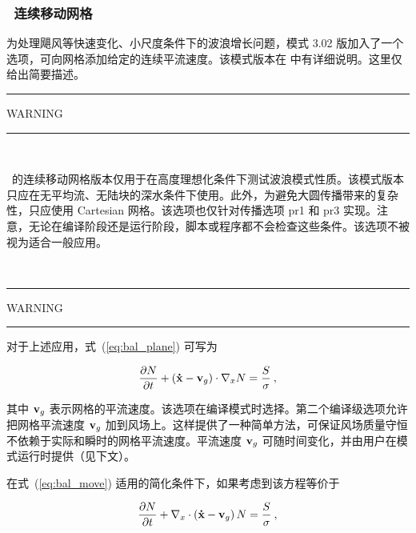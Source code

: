 \vsssub
\subsubsection{~连续移动网格} \label{sub:num_move}



为处理飓风等快速变化、小尺度条件下的波浪增长问题，模式 3.02 版加入了一个选项，可向网格添加给定的连续平流速度。该模式版本在 \cite{tol:OMOD05b} 中有详细说明。这里仅给出简要描述。



\begin{center}
\rule[1mm]{55mm}{1.0mm} WARNING \rule[1mm]{55mm}{1.0mm} \\
 \vspace{\baselineskip}
\parbox{120mm}{\ws\ 的连续移动网格版本仅用于在高度理想化条件下测试波浪模式性质。该模式版本只应在无平均流、无陆块的深水条件下使用。此外，为避免大圆传播带来的复杂性，只应使用 Cartesian 网格。该选项也仅针对传播选项 {\F pr1} 和 {\F pr3} 实现。注意，无论在编译阶段还是运行阶段，脚本或程序都不会检查这些条件。该选项不被视为适合一般应用。} \\
\vspace{\baselineskip}
\rule[1mm]{55mm}{1.0mm} WARNING \rule[1mm]{55mm}{1.0mm}
\end{center}

\noindent
对于上述应用，式~(\ref{eq:bal_plane}) 可写为

\begin{equation}
\frac{\partial N}{\partial t} + 
\left ( {\bf\dot{x}}-{\bf{v}}_g \right ) \cdot \nabla_x N  = 
\frac{S}{\sigma} \: , \label{eq:bal_move}
\end{equation}

\noindent
其中 ${\bf{v}}_g$ 表示网格的平流速度。该选项在编译模式时选择。第二个编译级选项允许把网格平流速度 ${\bf{v}}_g$ 加到风场上。这样提供了一种简单方法，可保证风场质量守恒不依赖于实际和瞬时的网格平流速度。平流速度 ${\bf{v}}_g$ 可随时间变化，并由用户在模式运行时提供（见下文）。




在式~(\ref{eq:bal_move}) 适用的简化条件下，如果考虑到该方程等价于

\begin{equation}
\frac{\partial N}{\partial t} + 
\nabla_x \cdot \left ( {\bf\dot{x}}-{\bf{v}}_g \right ) N  = 
\frac{S}{\sigma} \: , \label{eq:bal_move2}
\end{equation}

